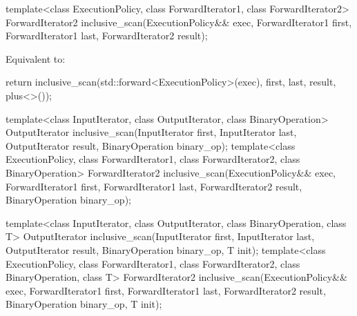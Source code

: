 %
\begin{itemdecl}
template<class ExecutionPolicy, class ForwardIterator1, class ForwardIterator2>
  ForwardIterator2 inclusive_scan(ExecutionPolicy&& exec,
                                ForwardIterator1 first, ForwardIterator1 last,
                                ForwardIterator2 result);
\end{itemdecl}

\begin{itemdescr}
\pnum
\effects Equivalent to:
\begin{codeblock}
return inclusive_scan(std::forward<ExecutionPolicy>(exec), first, last, result, plus<>());
\end{codeblock}
\end{itemdescr}

%
\begin{itemdecl}
template<class InputIterator, class OutputIterator, class BinaryOperation>
  OutputIterator inclusive_scan(InputIterator first, InputIterator last,
                                OutputIterator result, BinaryOperation binary_op);
template<class ExecutionPolicy, class ForwardIterator1, class ForwardIterator2,
         class BinaryOperation>
  ForwardIterator2 inclusive_scan(ExecutionPolicy&& exec,
                                  ForwardIterator1 first, ForwardIterator1 last,
                                  ForwardIterator2 result, BinaryOperation binary_op);

template<class InputIterator, class OutputIterator, class BinaryOperation, class T>
  OutputIterator inclusive_scan(InputIterator first, InputIterator last,
                                OutputIterator result, BinaryOperation binary_op, T init);
template<class ExecutionPolicy,
         class ForwardIterator1, class ForwardIterator2, class BinaryOperation, class T>
  ForwardIterator2 inclusive_scan(ExecutionPolicy&& exec,
                                  ForwardIterator1 first, ForwardIterator1 last,
                                  ForwardIterator2 result, BinaryOperation binary_op, T init);
\end{itemdecl}

